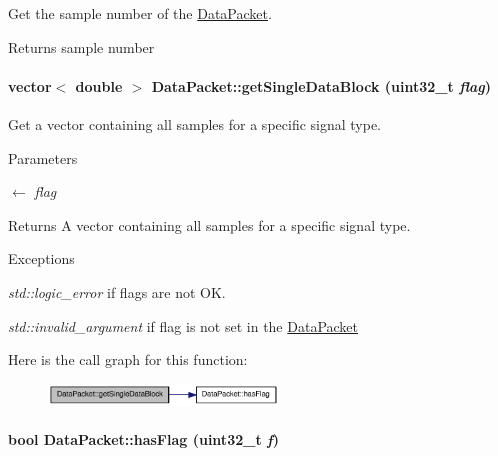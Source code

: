 Get the sample number of the \hyperlink{class_data_packet}{DataPacket}. \begin{DoxyReturn}{Returns}
sample number 
\end{DoxyReturn}
\hypertarget{class_data_packet_a4342e5412615ed2d09990b557bdb700a}{
\paragraph[{getSingleDataBlock}]{\setlength{\rightskip}{0pt plus 5cm}vector$<$ double $>$ DataPacket::getSingleDataBlock (uint32\_\-t {\em flag})}\hfill}
\label{class_data_packet_a4342e5412615ed2d09990b557bdb700a}


Get a vector containing all samples for a specific signal type. 
\begin{DoxyParams}{Parameters}
\item[\mbox{$\leftarrow$} {\em flag}]\end{DoxyParams}
\begin{DoxyReturn}{Returns}
A vector containing all samples for a specific signal type. 
\end{DoxyReturn}

\begin{DoxyExceptions}{Exceptions}
\item[{\em std::logic\_\-error}]if flags are not OK. \item[{\em std::invalid\_\-argument}]if flag is not set in the \hyperlink{class_data_packet}{DataPacket} \end{DoxyExceptions}


Here is the call graph for this function:\nopagebreak
\begin{figure}[H]
\begin{center}
\leavevmode
\includegraphics[width=173pt]{class_data_packet_a4342e5412615ed2d09990b557bdb700a_cgraph}
\end{center}
\end{figure}
\hypertarget{class_data_packet_a8fed63bfc2f0903b49d88805368d2161}{
\paragraph[{hasFlag}]{\setlength{\rightskip}{0pt plus 5cm}bool DataPacket::hasFlag (uint32\_\-t {\em f})}\hfill}
\label{class_data_packet_a8fed63bfc2f0903b49d88805368d2161}


